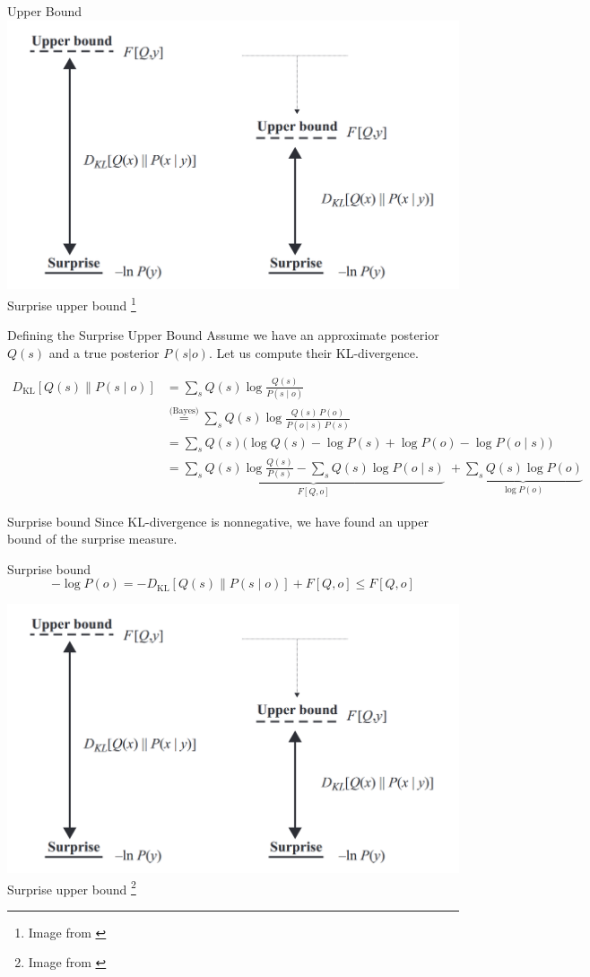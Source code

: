 \documentclass[aspectratio=1610, english]{beamer}
\begin{document}
\begin{frame}{Upper Bound}
\centering
\includegraphics[width=0.95\linewidth]{img/free_energy_bound.png}  
Surprise upper bound \footnote{Image from \cite{active-inference-book}}
\end{frame}

\begin{frame}{Defining the Surprise Upper Bound}
Assume we have an approximate posterior $Q(s)$ and a true posterior $P(s|o)$. Let us compute their KL-divergence.

\begin{align*}
D_{\mathrm{KL}}[Q(s)\|P(s\mid o)]
&= \sum_{s}Q(s)\log\frac{Q(s)}{P(s\mid o)} \\
&\overset{\text{(Bayes)}}{=} \sum_{s}Q(s)\log\frac{Q(s)\,P(o)}{P(o\mid s)\,P(s)} \\
&= \sum_{s}Q(s)\bigl(\log Q(s) - \log P(s) + \log P(o) - \log P(o\mid s)\bigr) \\
&= \underbrace{\sum_{s}Q(s)\log\frac{Q(s)}{P(s)} - \sum_{s}Q(s)\log P(o\mid s)}_{F[Q,o]}
    \;+
    \underbrace{\sum_{s}Q(s)\log P(o)}_{\log P(o)}
\end{align*}
\end{frame}

\begin{frame}{Surprise bound}
Since KL-divergence is nonnegative, we have found an upper bound of the surprise measure.
\begin{block}{Surprise bound}
    \begin{equation}
        -\log P(o) = -D_{\mathrm{KL}}[Q(s)\|P(s\mid o)] + F[Q,o] \leq F[Q,o]
    \end{equation}
\end{block}

\centering
\includegraphics[width=0.55\linewidth]{img/free_energy_bound.png}  \\
Surprise upper bound \footnote{Image from \cite{active-inference-book}}
\end{frame}
\end{document}
